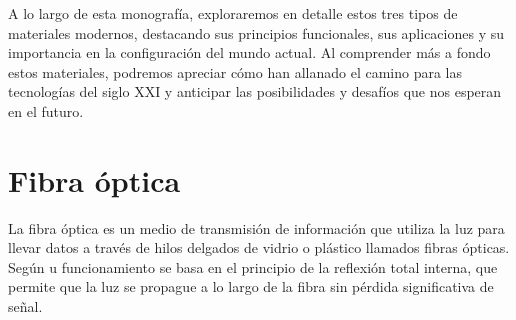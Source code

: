 \documentclass[10.5pt]{article}
\begin{document}
        A lo largo de esta monografía, exploraremos en detalle estos tres tipos de materiales modernos, destacando sus principios funcionales, sus aplicaciones y su importancia en la configuración del mundo actual. Al comprender más a fondo estos materiales, podremos apreciar cómo han allanado el camino para las tecnologías del siglo XXI y anticipar las posibilidades y desafíos que nos esperan en el futuro.

    \section{Fibra óptica}
    La fibra óptica es un medio de transmisión de información que utiliza la luz para llevar datos a través de hilos delgados de vidrio o plástico llamados fibras ópticas. Según \cite{vargas} u funcionamiento se basa en el principio de la reflexión total interna, que permite que la luz se propague a lo largo de la fibra sin pérdida significativa de señal.
\end{document}
